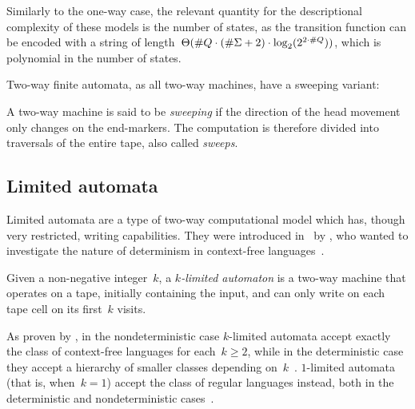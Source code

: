 Similarly to the one-way case, the relevant quantity for the descriptional complexity of these models is the number of states, as the transition function can be encoded with a string of length~$\Theta(\# Q\cdot(\# \Sigma+2)\cdot\log_2(2^{2\cdot\# Q}))$, which is polynomial in the number of states.

Two-way finite automata, as all two-way machines, have a sweeping variant:
\begin{defn}\label{def:sweeping}
	A two-way machine is said to be \emph{sweeping} if the direction of the head movement only changes on the end-markers.
	The computation is therefore divided into traversals of the entire tape, also called \emph{sweeps}.
\end{defn}


\subsection{Limited automata}
Limited automata are a type of two-way computational model which has, though very restricted, writing capabilities.
They were introduced in~\citeyear{Hib67} by \citeauthor{Hib67}, who wanted to investigate the nature of determinism in context-free languages~\cite{Hib67}.

Given a non-negative integer~$k$, a \emph{$k$-limited automaton} is a two-way machine that operates on a tape, initially containing the input, and can only write on each tape cell on its first~$k$ visits.

As proven by \citeauthor{Hib67}, in the nondeterministic case $k$-limited automata accept exactly the class of context-free languages for each~$k\ge2$, while in the deterministic case they accept a hierarchy of smaller classes depending on~$k$~\cite{Hib67}.
$1$-limited automata (that is, when~$k=1$) accept the class of regular languages instead, both in the deterministic and nondeterministic cases~\cite{WagWec86}.

